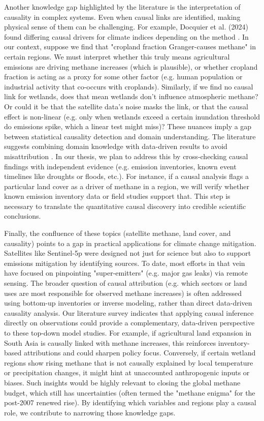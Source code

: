 Another knowledge gap highlighted by the literature is the interpretation of causality in complex systems. Even when causal links are identified, making physical sense of them can be challenging. For example, Docquier et al. (2024) \cite{Docquier2024} found differing causal drivers for climate indices depending on the method \cite{Docquier2024}. In our context, suppose we find that "cropland fraction Granger-causes methane" in certain regions. We must interpret whether this truly means agricultural emissions are driving methane increases (which is plausible), or whether cropland fraction is acting as a proxy for some other factor (e.g. human population or industrial activity that co-occurs with croplands). Similarly, if we find no causal link for wetlands, does that mean wetlands don't influence atmospheric methane? Or could it be that the satellite data's noise masks the link, or that the causal effect is non-linear (e.g. only when wetlands exceed a certain inundation threshold do emissions spike, which a linear test might miss)? These nuances imply a gap between statistical causality detection and domain understanding. The literature suggests combining domain knowledge with data-driven results to avoid misattribution \cite{silini_assessing_2023, Runge2019}. In our thesis, we plan to address this by cross-checking causal findings with independent evidence (e.g. emission inventories, known event timelines like droughts or floods, etc.). For instance, if a causal analysis flags a particular land cover as a driver of methane in a region, we will verify whether known emission inventory data or field studies support that. This step is necessary to translate the quantitative causal discovery into credible scientific conclusions.

Finally, the confluence of these topics (satellite methane, land cover, and causality) points to a gap in practical applications for climate change mitigation. Satellites like Sentinel-5p were designed not just for science but also to support emissions mitigation by identifying sources. To date, most efforts in that vein have focused on pinpointing "super-emitters" (e.g. major gas leaks) via remote sensing. The broader question of causal attribution (e.g. which sectors or land uses are most responsible for observed methane increases) is often addressed using bottom-up inventories or inverse modeling, rather than direct data-driven causality analysis. Our literature survey indicates that applying causal inference directly on observations could provide a complementary, data-driven perspective to these top-down model studies. For example, if agricultural land expansion in South Asia is causally linked with methane increases, this reinforces inventory-based attributions and could sharpen policy focus. Conversely, if certain wetland regions show rising methane that is not causally explained by local temperature or precipitation changes, it might hint at unaccounted anthropogenic inputs or biases. Such insights would be highly relevant to closing the global methane budget, which still has uncertainties (often termed the "methane enigma" for the post-2007 renewed rise). By identifying which variables and regions play a causal role, we contribute to narrowing those knowledge gaps.

